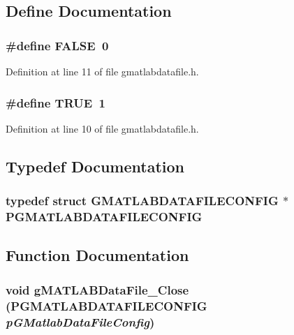 \subsection{Define Documentation}
\subsubsection[{FALSE}]{\setlength{\rightskip}{0pt plus 5cm}\#define FALSE~0}\label{gmatlabdatafile_8h_aa93f0eb578d23995850d61f7d61c55c1}


Definition at line 11 of file gmatlabdatafile.h.
\subsubsection[{TRUE}]{\setlength{\rightskip}{0pt plus 5cm}\#define TRUE~1}\label{gmatlabdatafile_8h_aa8cecfc5c5c054d2875c03e77b7be15d}


Definition at line 10 of file gmatlabdatafile.h.

\subsection{Typedef Documentation}
\subsubsection[{PGMATLABDATAFILECONFIG}]{\setlength{\rightskip}{0pt plus 5cm}typedef  struct {\bf GMATLABDATAFILECONFIG} $\ast$ {\bf PGMATLABDATAFILECONFIG}}\label{gmatlabdatafile_8h_ad671f2b5835bd3d8489ff011d38eace0}


\subsection{Function Documentation}
\subsubsection[{gMATLABDataFile\_\-Close}]{\setlength{\rightskip}{0pt plus 5cm}void gMATLABDataFile\_\-Close ({\bf PGMATLABDATAFILECONFIG} {\em pGMatlabDataFileConfig})}\label{gmatlabdatafile_8h_ad38283a16cbd66a2834b2ca9f5c6c6e0}


